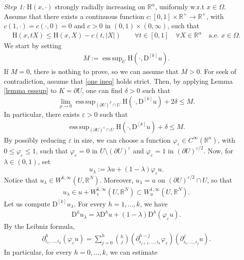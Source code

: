 \documentclass[a4paper,11pt]{article}
\numberwithin{equation}{section}
\newcommand{\numberset}{\mathbb}
\newcommand{\eps}{\varepsilon}
\newcommand{\Om}{\Omega}
\newcommand{\R}{\numberset{R}}
\newcommand{\rom}{\mathrm}
\DeclareMathOperator*{\esssup}{ess\,sup}
\theoremstyle{definition}
\begin{document}
\noindent
\textit{Step 1:} $\rom{H}(x,\cdot)$ strongly radially increasing on $\R^\alpha$, uniformly w.r.t $x\in \Omega$.\\ 
Assume that there exists a continuous function $c:[0,1]\times\R^+\to\R^+$, with $c(1,\cdot)=c(\cdot,0)=0$ and $c>0$ in $(0,1)\times(0,\infty)$, such that
\begin{align}\label{strong mon}
\rom{H}(x,tX)\leq \rom{H}(x,X)-c(t,|X|)\qquad\forall t\in[0,1]\quad\forall X\in\R^\alpha\quad\mbox{a.e. }x\in \Om.
\end{align}
We start by setting 
\begin{align}\label{M}
M:=\esssup_U \rom{H}(\cdot, \mathrm D ^{[k]}u).
\end{align}
If $M=0$, there is nothing to prove, so we can assume that $M>0$.
For seek of contradiction, assume that \eqref{one ineq} holds strict. Then, by applying Lemma \ref{lemma esssup} to $K=\partial U$, one can find $\delta>0$ such that
$$
\lim_{\rho\to0}\esssup_{(\partial U)^\rho\cap U}\rom{H}(\cdot, \mathrm D ^{[k]}u)+2\delta\leq M.
$$
In particular, there exists $\eps>0$ such that
\begin{align}\label{from contr}
\esssup_{(\partial U)^{\eps}\cap U}\rom{H}(\cdot, \mathrm D ^{[k]}u)+\delta\leq M.
\end{align}
By possibly reducing $\eps$ in size, we can choose a function $\varphi_\eps\in C^\infty(\R^n)$, with $0\leq\varphi_\eps\leq1$, such that $\varphi_\eps=0$ in $U\setminus (\partial U)^\eps$ and $\varphi_\eps=1$ in $(\partial U)^{\eps/2}$. Now, for $\lambda\in(0,1)$, set
$$
u_\lambda:=\lambda u + (1-\lambda)\varphi_\eps u.
$$
Notice that $u_\lambda\in W^{k,\infty}{(U,\R^N)}$. Moreover, $u_\lambda=u$ on $(\partial U)^{\eps/2}\cap U$, so that 
\begin{align}\label{u lambda}
u_\lambda\in u+W^{k,\infty}_c(U,\R^N)\subset W_u^{1,\infty}(U,\R^N).
\end{align}
Let us compute $\mathrm D^{[k]} u_\lambda$.  For every $h=1,\ldots, k$, we have
\begin{align}\label{deriv product}
\mathrm D^hu_\lambda=\lambda \mathrm D^h u+(1-\lambda)\mathrm D^h(\varphi_\eps u).
\end{align}
By the Leibniz formula,
\begin{align*}
\partial ^h_{i_1,\ldots,i_h}(\varphi_\eps u)=\sum_{j=0}^h \binom{h}{j}(\partial^{h-j}_{i_{j+1},\ldots, i_h} \varphi_\eps)(\partial^{j}_{i_{1},\ldots, i_j} u).
\end{align*}
In particular, for every $h=0,\ldots, k$, we can estimate
\end{document}
